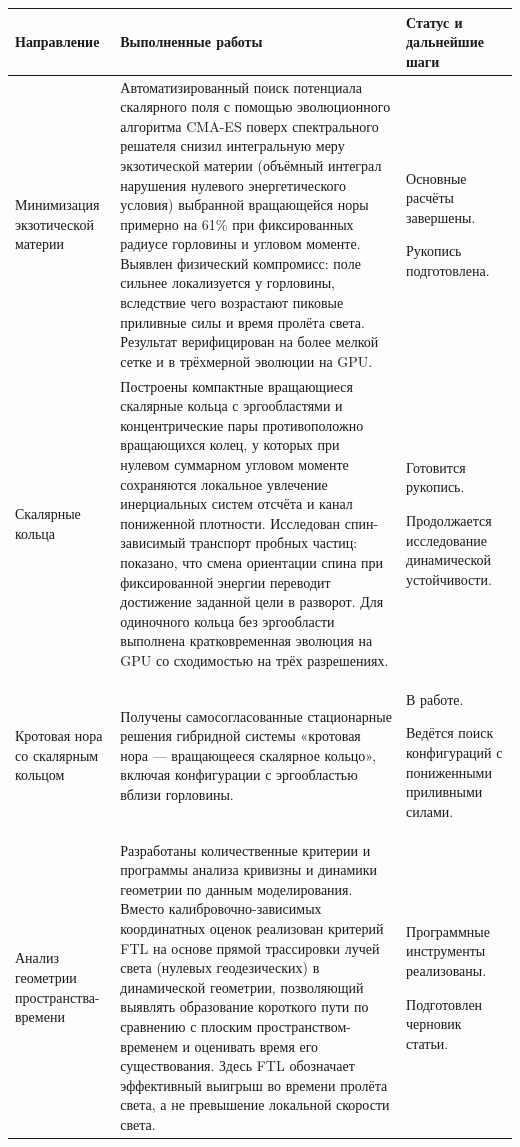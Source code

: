 \documentclass[11pt,a4paper]{article}
\begin{document}
{\fontsize{12pt}{14.4pt}\selectfont
\noindent
\begin{tabularx}{\textwidth}{@{}L{31mm}YL{31mm}@{}}
\toprule
\textbf{Направление} & \textbf{Выполненные работы} & \textbf{Статус и дальнейшие шаги} \\
\midrule
Минимизация экзотической материи
& Автоматизированный поиск потенциала скалярного поля с помощью эволюционного алгоритма CMA-ES поверх спектрального решателя снизил интегральную меру экзотической материи (объёмный интеграл нарушения нулевого энергетического условия) выбранной вращающейся норы примерно на 61\% при фиксированных радиусе горловины и угловом моменте. Выявлен физический компромисс: поле сильнее локализуется у горловины, вследствие чего возрастают пиковые приливные силы и время пролёта света. Результат верифицирован на более мелкой сетке и в трёхмерной эволюции на GPU.
& Основные расчёты завершены.\par Рукопись подготовлена. \\
\midrule
Скалярные кольца
& Построены компактные вращающиеся скалярные кольца с эргообластями и концентрические пары противоположно вращающихся колец, у которых при нулевом суммарном угловом моменте сохраняются локальное увлечение инерциальных систем отсчёта и канал пониженной плотности. Исследован спин-зависимый транспорт пробных частиц: показано, что смена ориентации спина при фиксированной энергии переводит достижение заданной цели в разворот. Для одиночного кольца без эргообласти выполнена кратковременная эволюция на GPU со сходимостью на трёх разрешениях.
& Готовится рукопись.\par Продолжается исследование динамической устойчивости. \\
\midrule
Кротовая нора со скалярным кольцом
& Получены самосогласованные стационарные решения гибридной системы «кротовая нора --- вращающееся скалярное кольцо», включая конфигурации с эргообластью вблизи горловины.
& В работе.\par Ведётся поиск конфигураций с пониженными приливными силами. \\
\midrule
Анализ геометрии пространства-времени
& Разработаны количественные критерии и программы анализа кривизны и динамики геометрии по данным моделирования. Вместо калибровочно-зависимых координатных оценок реализован критерий FTL на основе прямой трассировки лучей света (нулевых геодезических) в динамической геометрии, позволяющий выявлять образование короткого пути по сравнению с плоским пространством-временем и оценивать время его существования. Здесь FTL обозначает эффективный выигрыш во времени пролёта света, а не превышение локальной скорости света.
& Программные инструменты реализованы.\par Подготовлен черновик статьи. \\
\bottomrule
\end{tabularx}
\par
}
\end{document}

